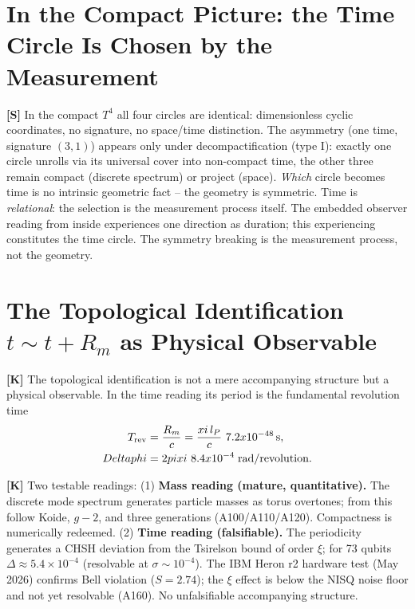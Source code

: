 \section{In the Compact Picture: the Time Circle Is Chosen by the Measurement}

\textbf{[S]} In the compact $T^4$ all four circles are identical: dimensionless
cyclic coordinates, no signature, no space/time distinction. The asymmetry (one
time, signature $(3,1)$) appears only under decompactification (type I): exactly
one circle unrolls via its universal cover into non-compact time, the other three
remain compact (discrete spectrum) or project (space). \emph{Which} circle becomes
time is no intrinsic geometric fact -- the geometry is symmetric. Time is
\emph{relational}: the selection is the measurement process itself. The embedded
observer reading from inside experiences one direction as duration; this
experiencing constitutes the time circle. The symmetry breaking is the measurement
process, not the geometry.

\section{The Topological Identification $t\sim t+R_m$ as Physical Observable}

\textbf{[K]} The topological identification is not a mere accompanying structure
but a physical observable. In the time reading its period is the fundamental
revolution time
\begin{align}
  T_\text{rev} &= \frac{R_m}{c} = \frac{\xi\,\ell_P}{c}\approx 7{.}2\times10^{-48}\,\text{s}, \notag\\
  \Delta\phi   &= 2\pi\xi\approx 8{.}4\times10^{-4}\;\text{rad/revolution}. \notag
\end{align}

\textbf{[K]} Two testable readings: (1) \textbf{Mass reading (mature,
quantitative).} The discrete mode spectrum generates particle masses as torus
overtones; from this follow Koide, $g-2$, and three generations (A100/A110/A120).
Compactness is numerically redeemed. (2) \textbf{Time reading (falsifiable).}
The periodicity generates a CHSH deviation from the Tsirelson bound of order $\xi$;
for 73 qubits $\Delta\approx5{.}4\times10^{-4}$ (resolvable at $\sigma\sim10^{-4}$).
The IBM Heron r2 hardware test (May 2026) confirms Bell violation ($S=2{.}74$); the
$\xi$ effect is below the NISQ noise floor and not yet resolvable (A160). No
unfalsifiable accompanying structure.

